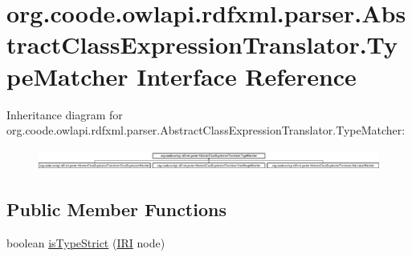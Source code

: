 \hypertarget{interfaceorg_1_1coode_1_1owlapi_1_1rdfxml_1_1parser_1_1_abstract_class_expression_translator_1_1_type_matcher}{\section{org.\-coode.\-owlapi.\-rdfxml.\-parser.\-Abstract\-Class\-Expression\-Translator.\-Type\-Matcher Interface Reference}
\label{interfaceorg_1_1coode_1_1owlapi_1_1rdfxml_1_1parser_1_1_abstract_class_expression_translator_1_1_type_matcher}
}
Inheritance diagram for org.\-coode.\-owlapi.\-rdfxml.\-parser.\-Abstract\-Class\-Expression\-Translator.\-Type\-Matcher\-:\begin{figure}[H]
\begin{center}
\leavevmode
\includegraphics[height=0.688807cm]{interfaceorg_1_1coode_1_1owlapi_1_1rdfxml_1_1parser_1_1_abstract_class_expression_translator_1_1_type_matcher}
\end{center}
\end{figure}
\subsection*{Public Member Functions}
\begin{DoxyCompactItemize}
\item 
boolean \hyperlink{interfaceorg_1_1coode_1_1owlapi_1_1rdfxml_1_1parser_1_1_abstract_class_expression_translator_1_1_type_matcher_a8681a2ec4ff12fd0fd9fca6183f88f9b}{is\-Type\-Strict} (\hyperlink{classorg_1_1semanticweb_1_1owlapi_1_1model_1_1_i_r_i}{I\-R\-I} node)
\end{DoxyCompactItemize}



